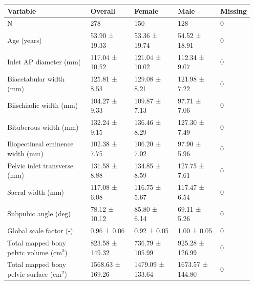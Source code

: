 \begin{tabular}{lllll}
\toprule
Variable & Overall & Female & Male & Missing \\
\midrule
N & 278 & 150 & 128 & 0 \\
Age (years) & 53.90 ± 19.33 & 53.36 ± 19.74 & 54.52 ± 18.91 & 0 \\
Inlet AP diameter (mm) & 117.04 ± 10.52 & 121.04 ± 10.02 & 112.34 ± 9.07 & 0 \\
Biacetabular width (mm) & 125.81 ± 8.53 & 129.08 ± 8.21 & 121.98 ± 7.22 & 0 \\
Biischiadic width (mm) & 104.27 ± 9.33 & 109.87 ± 7.13 & 97.71 ± 7.06 & 0 \\
Bituberous width (mm) & 132.24 ± 9.15 & 136.46 ± 8.29 & 127.30 ± 7.49 & 0 \\
Iliopectineal eminence width (mm) & 102.38 ± 7.75 & 106.20 ± 7.02 & 97.90 ± 5.96 & 0 \\
Pelvic inlet transverse (mm) & 131.58 ± 8.88 & 134.85 ± 8.59 & 127.75 ± 7.61 & 0 \\
Sacral width (mm) & 117.08 ± 6.08 & 116.75 ± 5.67 & 117.47 ± 6.54 & 0 \\
Subpubic angle (deg) & 78.12 ± 10.12 & 85.80 ± 6.14 & 69.11 ± 5.26 & 0 \\
Global scale factor (-) & 0.96 ± 0.06 & 0.92 ± 0.05 & 1.00 ± 0.05 & 0 \\
Total mapped bony pelvic volume (cm$^3$) & 823.58 ± 149.32 & 736.79 ± 105.99 & 925.28 ± 126.99 & 0 \\
Total mapped bony pelvic surface (cm$^2$) & 1568.63 ± 169.26 & 1479.09 ± 133.64 & 1673.57 ± 144.80 & 0 \\
\bottomrule
\end{tabular}
